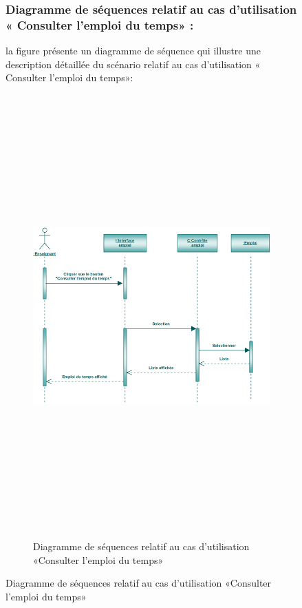 \documentclass[12 pt]{report}
\begin{document}
\begin{figure}[h]
\begin{center}
\subsubsection{Diagramme de séquences relatif au cas d’utilisation « Consulter l'emploi du temps» :}
la figure   présente un diagramme de séquence qui illustre une description détaillée du scénario relatif au cas d’utilisation « Consulter l'emploi du temps»: 
\begin{figure}[h]
 \begin{center}
\includegraphics[width= 18 cm ,height=  17cm]{sce.PNG}
\caption{Diagramme de séquences relatif au cas d’utilisation «Consulter l'emploi du temps»}

\end{center}
\end{figure}


\end{center}
\end{figure}
\end{document}
